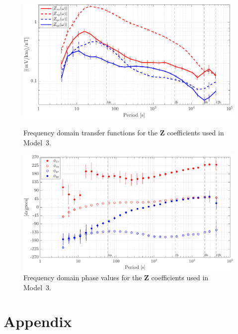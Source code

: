 \documentclass[draft,linenumbers]{agujournal2018}
\begin{document}
\begin{figure}[h]
  \centering
  \includegraphics[width=\textwidth]{figures/plot_model_summary_Z_MT-options-1-v0-o0.pdf}
  \caption{Frequency domain transfer functions for the $\mathbf{Z}$ coefficients used in Model~3.}
  \label{Z_MT}

  \vspace{4em}

  \centering
  \includegraphics[width=\textwidth]{figures/plot_model_summary_Phi_MT-options-1-v1-o0.pdf}
  \caption{Frequency domain phase values for the $\mathbf{Z}$ coefficients used in Model~3.}
  \label{Phi_MT}
\end{figure}

\clearpage

\section{Appendix}

\setcounter{table}{0}
\renewcommand{\thetable}{A\arabic{table}}
\end{document}
